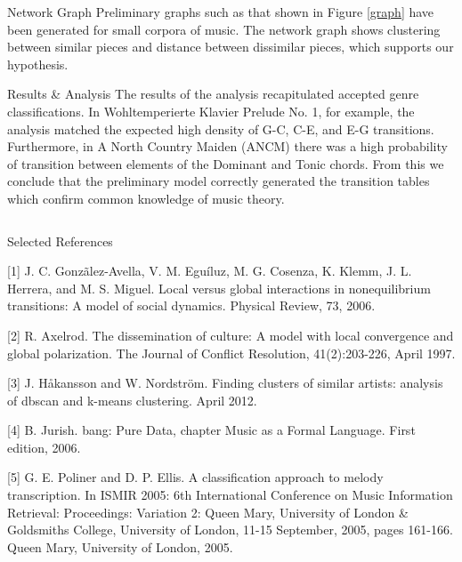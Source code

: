 \documentclass[final]{beamer}
\newlength{\onecolwid}
\newlength{\onecolwidtwo}
\newlength{\halfcolwid}
\newlength{\halfcolwidtwo}
\begin{document}
\begin{frame}[t]
\begin{columns}[t]
\begin{column}{\onecolwidtwo}
\begin{columns}[t]
\begin{column}{\halfcolwidtwo}

\vskip2in
\begin{block}{Network Graph}
Preliminary graphs such as that shown in Figure \ref{graph} have been generated for small corpora of music. The network graph shows clustering between similar pieces and distance between dissimilar pieces, which supports our hypothesis.
\end{block}

\vskip1.5in
\begin{block}{Results \& Analysis}
The results of the analysis recapitulated accepted genre classifications. In Wohltemperierte Klavier Prelude No. 1, for example, the analysis matched the expected high density of G-C, C-E, and E-G transitions. Furthermore, in A North Country Maiden (ANCM) there was a high probability of transition between elements of the Dominant and Tonic chords. From this we conclude that the preliminary model correctly generated the transition tables which confirm common knowledge of music theory. 
\end{block}
\end{column}
\end{columns}

\begin{column}{\onecolwidtwo}
\begin{block}{Selected References}

[1]	J. C. Gonz\~{a}lez-Avella, V. M. Egu\'iluz, M. G. Cosenza, K. Klemm, J. L. Herrera, and M. S. Miguel. Local versus global interactions in nonequilibrium transitions: A model of social dynamics. Physical Review, 73, 2006.

[2]	R. Axelrod. The dissemination of culture: A model with local convergence and global polarization. The Journal of Conflict Resolution, 41(2):203-226, April 1997.

[3]	J. H\aa kansson and W. Nordstr\"om. Finding clusters of similar artists: analysis of dbscan and k-means clustering. April 2012.

[4]	B. Jurish. bang: Pure Data, chapter Music as a Formal Language. First edition, 2006.

[5]	G. E. Poliner and D. P. Ellis. A classification approach to melody transcription. In ISMIR 2005: 6th International Conference on Music Information Retrieval: Proceedings: Variation 2: Queen Mary, University of London \& Goldsmiths College, University of London, 11-15 September, 2005, pages 161-166. Queen Mary, University of London, 2005.


\end{block}
\end{column}
\end{column}
\end{columns}
\end{frame}
\end{document}
